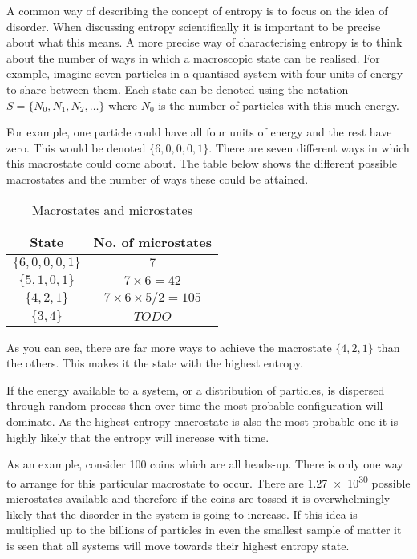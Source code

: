 \documentclass[main.tex]{subfiles}
\begin{document}
A common way of describing the concept of entropy is to focus on the idea of disorder. When discussing entropy scientifically it is important to be precise about what this means. A more precise way of characterising entropy is to think about the number of ways in which a macroscopic state can be realised. For example, imagine seven particles in a quantised system with four units of energy to share between them. Each state can be denoted using the notation $S = \{N_0,N_1,N_2,\ldots\}$ where $N_0$ is the number of particles with this much energy.

For example, one particle could have all four units of energy and the rest have zero. This would be denoted $\{6,0,0,0,1\}$. There are seven different ways in which this macrostate could come about. The table below shows the different possible macrostates and the number of ways these could be attained.

\begin{table}[h]
\begin{center}
  \begin{tabular}{c|c}
    \textbf{State} & \textbf{No. of microstates} \\ \hline
    $\{6,0,0,0,1\}$ & $ 7$ \\
    $\{5,1,0,1\}$ &  $7 \times 6 = 42$ \\
    $\{4,2,1\}$ & $ 7 \times 6 \times 5 / 2 = 105$ \\
    $\{3,4\}$ & $ TODO$
  \end{tabular}
\end{center}
  \caption{Macrostates and microstates}
  \label{tbl:macro}
\end{table}

As you can see, there are far more ways to achieve the macrostate $\{4,2,1\}$ than the others. This makes it the state with the highest entropy.


If the energy available to a system, or a distribution of particles, is dispersed through random process then over time the most probable configuration will dominate. As the highest entropy macrostate is also the most probable one it is highly likely that the entropy will increase with time.

As an example, consider 100 coins which are all heads-up. There is only one way to arrange for this particular macrostate to occur. There are \num{1.27e30} possible microstates available and therefore if the coins are tossed it is overwhelmingly likely that the disorder in the system is going to increase. If this idea is multiplied up to the billions of particles in even the smallest sample of matter it is seen that all systems will move towards their highest entropy state.
\end{document}
